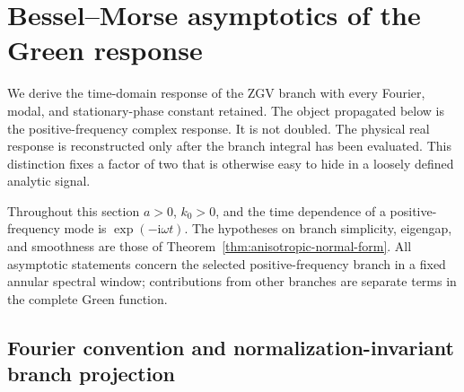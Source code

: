 
\section{Bessel--Morse asymptotics of the Green response}
\label{sec:green-function-asymptotics}

We derive the time-domain response of the ZGV branch with every Fourier,
modal, and stationary-phase constant retained.  The object propagated below
is the positive-frequency complex response.  It is not doubled.  The
physical real response is reconstructed only after the branch integral has
been evaluated.  This distinction fixes a factor of two that is otherwise
easy to hide in a loosely defined analytic signal.

Throughout this section \(a>0\), \(k_0>0\), and the time dependence of a
positive-frequency mode is \(\exp(-\mathrm{i}\omega t)\).  The hypotheses
on branch simplicity, eigengap, and smoothness are those of
Theorem~\ref{thm:anisotropic-normal-form}.  All asymptotic statements concern
the selected positive-frequency branch in a fixed annular spectral window;
contributions from other branches are separate terms in the complete Green
function.

\subsection{Fourier convention and normalization-invariant branch projection}

